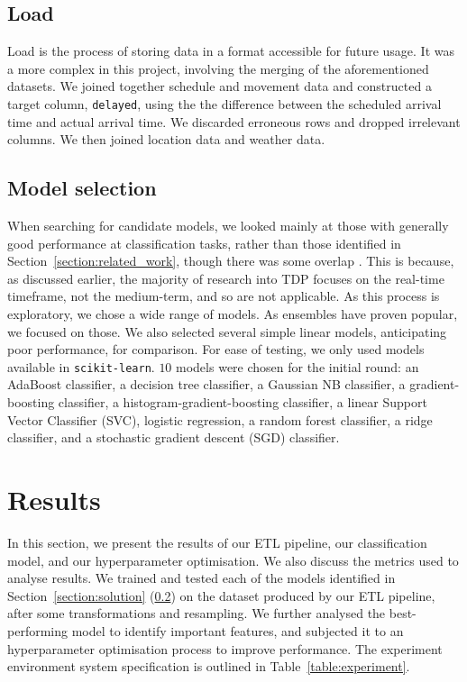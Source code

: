 \documentclass[12pt,a4paper]{article}
\begin{document}
\subsection{Load}

Load is the process of storing data in a format accessible for future usage. It was a more complex in this project, involving the merging of the aforementioned datasets. We joined together schedule and movement data and constructed a target column, \verb|delayed|, using the the difference between the scheduled arrival time and actual arrival time. We discarded erroneous rows and dropped irrelevant columns. We then joined location data and weather data. 

\subsection{Model selection}
\label{subsection:model_selection}

When searching for candidate models, we looked mainly at those with generally good performance at classification tasks, rather than those identified in Section~\ref{section:related_work}, though there was some overlap \cite{wang_zhang_2019,wang_work_2015}. This is because, as discussed earlier, the majority of research into TDP focuses on the real-time timeframe, not the medium-term, and so are not applicable. As this process is exploratory, we chose a wide range of models. As ensembles have proven popular, we focused on those. We also selected several simple linear models, anticipating poor performance, for comparison. For ease of testing, we only used models available in \verb|scikit-learn|. $10$ models were chosen for the initial round: an AdaBoost classifier, a decision tree classifier, a Gaussian NB classifier, a gradient-boosting classifier, a histogram-gradient-boosting classifier, a linear Support Vector Classifier (SVC), logistic regression, a random forest classifier, a ridge classifier, and a stochastic gradient descent (SGD) classifier.

\clearpage
\section{Results}

In this section, we present the results of our ETL pipeline, our classification model, and our hyperparameter optimisation. We also discuss the metrics used to analyse results. We trained and tested each of the models identified in Section~\ref{section:solution} (\ref{subsection:model_selection}) on the dataset produced by our ETL pipeline, after some transformations and resampling. We further analysed the best-performing model to identify important features, and subjected it to an hyperparameter optimisation process to improve performance. The experiment environment system specification is outlined in Table~\ref{table:experiment}.
\end{document}
